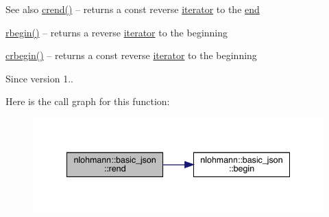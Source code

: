 \begin{DoxySeeAlso}{See also}
\mbox{\hyperlink{classnlohmann_1_1basic__json_a5795b029dbf28e0cb2c7a439ec5d0a88}{crend()}} -- returns a const reverse \mbox{\hyperlink{classnlohmann_1_1basic__json_a099316232c76c034030a38faa6e34dca}{iterator}} to the \mbox{\hyperlink{classnlohmann_1_1basic__json_a13e032a02a7fd8a93fdddc2fcbc4763c}{end}} 

\mbox{\hyperlink{classnlohmann_1_1basic__json_a1ef93e2006dbe52667294f5ef38b0b10}{rbegin()}} -- returns a reverse \mbox{\hyperlink{classnlohmann_1_1basic__json_a099316232c76c034030a38faa6e34dca}{iterator}} to the beginning 

\mbox{\hyperlink{classnlohmann_1_1basic__json_a1e0769d22d54573f294da0e5c6abc9de}{crbegin()}} -- returns a const reverse \mbox{\hyperlink{classnlohmann_1_1basic__json_a099316232c76c034030a38faa6e34dca}{iterator}} to the beginning
\end{DoxySeeAlso}
\begin{DoxySince}{Since}
version 1.. 
\end{DoxySince}
Here is the call graph for this function\+:\nopagebreak
\begin{figure}[H]
\begin{center}
\leavevmode
\includegraphics[width=341pt]{classnlohmann_1_1basic__json_ac77aed0925d447744676725ab0b6d535_cgraph}
\end{center}
\end{figure}
\mbox{\label{classnlohmann_1_1basic__json_a4f73d4cee67ea328d785979c22af0ae1}} 
